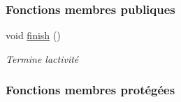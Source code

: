 \subsubsection*{Fonctions membres publiques}
\begin{DoxyCompactItemize}
\item 
void \hyperlink{classcom_1_1example_1_1area_1_1_i_h_m_gestion_partie_aafa9ce81364dbd851409ae0b38138e28}{finish} ()
\begin{DoxyCompactList}\small\item\em Termine l\textquotesingle{}activité \end{DoxyCompactList}\end{DoxyCompactItemize}
\subsubsection*{Fonctions membres protégées}
